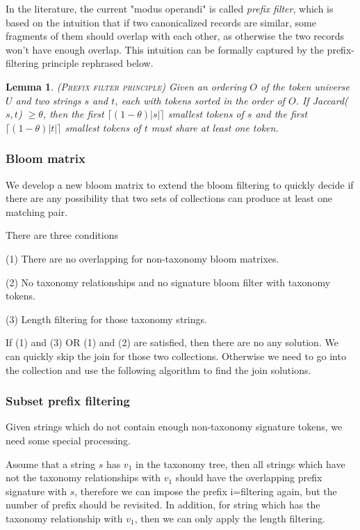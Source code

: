 \documentclass{sig-alternate}
\newtheorem{lem}[theorem]{Lemma}
\renewcommand{\geq}{\geqslant}
\begin{document}
In the literature, the current "modus operandi" is called \textit{prefix filter}, which is based on the intuition that if two canonicalized records are similar, some fragments of them should overlap with each other, as otherwise the two records
won't have enough overlap. This intuition can be formally captured by the prefix-filtering
principle \cite{conf/icde/ChaudhuriGK06} rephrased below.

\begin{lem} (\textsc{Prefix filter principle}) \cite{conf/icde/ChaudhuriGK06} Given an
ordering $O$ of the token universe $U$ and two strings $s$ and $t$, each with tokens sorted in the
order of $O$.   If Jaccard($s, t$) $\geq \theta$, then the first $\lceil(1-\theta)|s|\rceil$ smallest
tokens of $s$ and the first $\lceil(1-\theta)|t|\rceil$ smallest
tokens of $t$  must share at least one token.
\end{lem}

\subsubsection{Bloom matrix}

We develop a new bloom matrix to extend the bloom filtering to quickly decide if there are any possibility that two sets of collections can produce at least one matching pair.

There are three conditions

(1) There are no overlapping for non-taxonomy bloom matrixes.

(2) No taxonomy relationships and no signature bloom filter with taxonomy tokens.

(3) Length filtering for those taxonomy strings.

If (1) and (3) OR (1) and (2) are satisfied, then there are no any solution. We can quickly skip the join for those two collections. Otherwise we need to go into the collection and use the following algorithm to find the join solutions.


\subsubsection{Subset prefix filtering}

Given strings which do not contain enough non-taxonomy signature tokens, we need some special processing.

Assume that a string $s$ has $v_1$ in the taxonomy tree, then all strings which have not the taxonomy relationships with $v_1$ should have the overlapping prefix signature with $s$, therefore we can impose the prefix i=filtering again, but the number of prefix should be revisited. In addition, for string which has the taxonomy relationship with $v_1$, then we can only apply the length filtering.
\end{document}
